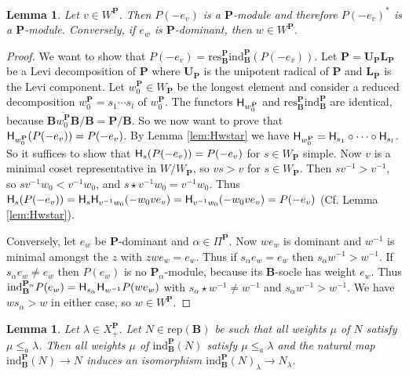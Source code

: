 \documentclass[sn-mathphys-num]{sn-jnl}%
\newcommand{\rep}{{\mathrm{rep}}}
\newcommand{\ind}{{\mathrm{ind}}}
\newcommand{\res}{{\mathrm{res}}}
\newcommand{\sH}{{\sf H}}
\newcommand{\fb}{\mathbf B}
\newcommand{\bp}{\mathbf P}
\newcommand{\bu}{\mathbf U}
\newcommand{\bl}{\mathbf L}
\newtheorem{lemma}[theorem]{Lemma}
\theoremstyle{definition}
\begin{document}
\begin{lemma}\label{lem:PisP}Let $v\in W^\bp$.
Then $P(-e_v)$ is a $\bp$-module and therefore $P(-e_v)^*$ is a $\bp$-module.
Conversely, if $e_w$ is  $\bp$-dominant, then $w\in W^\bp$.
\end{lemma}
\begin{proof}
We want to show that $P(-e_v)=\res^\bp_\fb\ind_\fb^\bp(P(-e_v))$.
Let $\bp=\bu_{\bp}\bl_{\bp}$ be a Levi decomposition of $\bp$ where $\bu_{\bp}$ is the unipotent radical of $\bp$ and $\bl_{\bp}$ is the Levi component. Let $w_0^{\bp}\in W_\bp$ be the longest element and consider a reduced decomposition $w_0^{\bp}=s_{1}\cdots s_{l}$ of $w_0^\bp$. The  functors ${\sf H}_{w_0^{\bp}}$ and $\res^\bp_\fb\ind_\fb^\bp$  are identical, because 
    $\overline{\fb w_0^{\bp}\fb}/\fb=\bp/\fb$. So we now want to prove that ${\sf H}_{w_0^{\bp}}(P(-e_v))=P(-e_v)$. 
By Lemma \ref{lem:Hwstar}
we have ${\sf H}_{w_0^{\bp}}=\sH_{s_{1}}\circ\cdots\circ\sH_{s_{l}}$.
So it suffices to show that $\sH_s(P(-e_v))=P(-e_v)$ for $s\in W_\bp$ simple.
 Now $v$ is a minimal coset representative in $W/W_\bp$, so $vs>v$ for $s\in W_\bp$.
Then $s v^{-1}>v^{-1}$, so $s v^{-1}w_0<v^{-1}w_0$, and $s\star v^{-1}w_0=v^{-1}w_0$.
Thus $\sH_s(P(-e_v))=
{\sH}_{s}{\sH}_{v^{-1}w_0}(-w_0ve_v)={\sH}_{v^{-1}w_0}(-w_0ve_v)=P(-e_v)$ (Cf. Lemma \ref{lem:Hwstar}). 

Conversely, let  $e_w$ be $\bp$-dominant and  $\alpha\in \Pi^\bp$.
 Now $we_w$ is dominant and $w^{-1}$ is minimal amongst the $z$ with $zwe_w=e_w$. Thus if $s_\alpha e_w= e_w$ then $s_\alpha w^{-1}>w^{-1}$.
If $s_\alpha e_w\neq e_w$ then $P(e_w)$ is no $\bp_\alpha$-module, because its $\fb$-socle has weight $e_w$. Thus $\ind_\fb^{\bp_\alpha}P(e_w)={\sf H}_{s_\alpha}{\sf H}_{ w^{-1}}P(we_w)$ with $s_\alpha\star  w^{-1}\neq  w^{-1}$
and
$s_\alpha w^{-1}>w^{-1}$. 
  We have $w s_\alpha>w$ in either case, so $w\in W^\bp$.

\end{proof}

\begin{lemma}\label{lem:indpreserve}Let $\lambda\in X^\bp_+$.
Let $N\in\rep(\fb)$ be such that all weights $\mu$ of $N$ satisfy $\mu\leq_a\lambda$.
Then all weights $\mu$ of $\ind_\fb^\bp(N)$ satisfy $\mu\leq_a\lambda$ and the natural map $\ind_\fb^\bp(N)\to N$ 
induces an isomorphism $\ind_\fb^\bp(N)_\lambda\to N_\lambda$.
\end{lemma}
\end{document}
